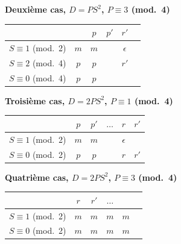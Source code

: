 \documentclass[11pt,a4paper]{article}
\begin{document}
\begin{center}
\textbf{Deuxi\`{e}me cas, $D = PS^2$, $P \equiv 3$ (mod.\ 4)}
\end{center}
\begin{center}
\begin{tabular}{c|ccccc}
 & & $p$ & $p'$ & $r'$ & \\
\hline
$S \equiv 1$ (mod.\ 2) & $m$ & $m$ & & $\epsilon$ & \\
$S \equiv 2$ (mod.\ 4) & $p$ & $p$ & & $r'$ & \\
$S \equiv 0$ (mod.\ 4) & $p$ & $p$ & & &
\end{tabular}
\end{center}

\begin{center}
\textbf{Troisi\`{e}me cas, $D = 2PS^2$, $P \equiv 1$ (mod.\ 4)}
\end{center}
\begin{center}
\begin{tabular}{c|ccccc}
 & $p$ & $p'$ & $\ldots$ & $r$ & $r'$ \\
\hline
$S \equiv 1$ (mod.\ 2) & $m$ & $m$ & & $\epsilon$ & \\
$S \equiv 0$ (mod.\ 2) & $p$ & $p$ & & $r$ & $r'$
\end{tabular}
\end{center}

\begin{center}
\textbf{Quatri\`{e}me cas, $D = 2PS^2$, $P \equiv 3$ (mod.\ 4)}
\end{center}
\begin{center}
\begin{tabular}{c|ccccc}
 & $r$ & $r'$ & $\ldots$ & & \\
\hline
$S \equiv 1$ (mod.\ 2) & $m$ & $m$ & $m$ & $m$ & \\
$S \equiv 0$ (mod.\ 2) & $m$ & $m$ & $m$ & $m$ &
\end{tabular}
\end{center}
\end{document}

